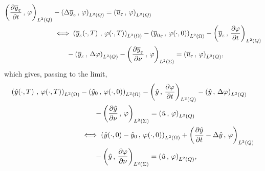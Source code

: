 \begin{equation*}
    \begin{split}
        \scalaireq{\primetemps{\bareps{y}}}{\vphi} &- \scalaireq{%
            \Delta\bareps{y}
        }{%
            \vphi%
        } = \scalaireq{\bareps{u}}{\vphi}\\
        &\iff \scalaireohm{%
            \condfinale{\bareps{y}}
        }{%
            \condfinale{\vphi}
        } - \scalaireohm{%
            {\bar{y}_{0}}_{\veps}
        }{%
            \condinitiale{\vphi}
        } - \scalaireq{%
            \bareps{y}
        }{%
            \primetemps{\vphi}
        }\\
        &\qquad - \scalaireq{%
            \bareps{y}
        }{%
            \Delta\vphi%
        } - \scalaires{%
            \deriveenormale{\bareps{y}}
        }{%
            \vphi%
        } = \scalaireq{\bareps{u}}{\vphi},
    \end{split}
\end{equation*}
which gives, passing to the limit,
\begin{equation*}
    \begin{split}
        \scalaireohm{%
            \condfinale{\hat{y}}
        }{%
            \condfinale{\vphi}
        } & - \scalaireohm{%
            {\hat{y}}_{0}
        }{%
            \condinitiale{\vphi}
        } - \scalaireq{%
            \hat{y}
        }{%
            \primetemps{\vphi}
        } - \scalaireq{%
            \hat{y}
        }{%
            \Delta\vphi%
        }\\
        &\qquad - \scalaires{%
            \deriveenormale{\hat{y}}
        }{%
            \vphi%
        } = \scalaireq{\hat{u}}{\vphi}\\
        &\iff \scalaireohm{%
            \condinitiale{\hat{y}} - {\hat{y}}_{0}
        }{%
            \condinitiale{\vphi}
        } + \scalaireq{%
            \primetemps{\hat{y}} - \Delta\hat{y}
        }{%
            \vphi%
        }\\
        &\qquad - \scalaires{%
            \hat{y}
        }{%
            \deriveenormale{\vphi}
        } = \scalaireq{\hat{u}}{\vphi},
    \end{split}
\end{equation*}
